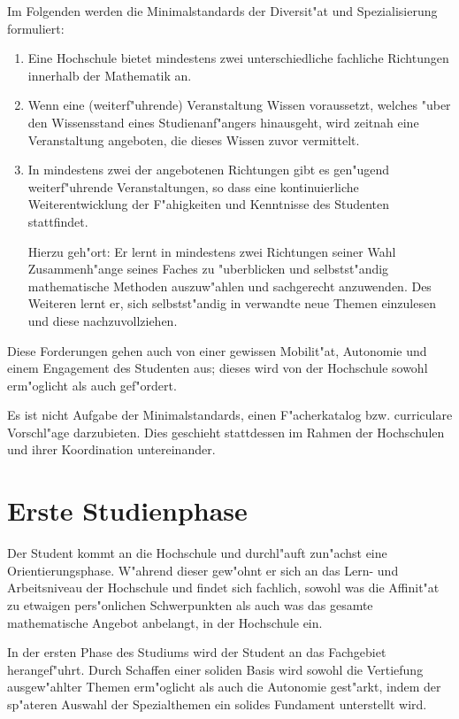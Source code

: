 \newpage
Im Folgenden werden die Minimalstandards der Diversit"at und Spezialisierung formuliert:
\begin{enumerate}
\item Eine Hochschule bietet mindestens zwei unterschiedliche fachliche Richtungen innerhalb der Mathematik an.

\item Wenn eine (weiterf"uhrende) Veranstaltung Wissen voraussetzt,
welches "uber den Wissensstand eines Studienanf"angers hinausgeht,
wird zeitnah eine Veranstaltung angeboten, die dieses Wissen zuvor vermittelt.

\item In mindestens zwei der angebotenen Richtungen gibt es gen"ugend
weiterf"uhrende Veranstaltungen, so dass eine kontinuierliche
Weiterentwicklung der F"ahigkeiten und Kenntnisse des Studenten
stattfindet.

Hierzu geh"ort: Er lernt in mindestens zwei Richtungen seiner Wahl
Zusammenh"ange seines Faches zu "uberblicken und selbstst"andig
mathematische Methoden auszuw"ahlen und sachgerecht anzuwenden.
Des Weiteren lernt er, sich selbstst"andig in verwandte neue Themen
einzulesen und diese nachzuvollziehen.
\end{enumerate}

Diese Forderungen gehen auch von einer gewissen Mobilit"at, Autonomie
und einem Engagement des Studenten aus; dieses wird von
der Hochschule sowohl erm"oglicht als auch gef"ordert.

Es ist nicht Aufgabe der Minimalstandards, einen F"acherkatalog bzw.
curriculare Vorschl"age darzubieten. Dies geschieht stattdessen im
Rahmen der Hochschulen und ihrer Koordination untereinander.




\section{Erste Studienphase}

Der
Student kommt an die Hochschule und durchl"auft zun"achst eine Orientierungsphase.
W"ahrend dieser gew"ohnt er sich an das Lern- und Arbeitsniveau der Hochschule und
findet sich fachlich, sowohl was die Affinit"at zu etwaigen pers"onlichen Schwerpunkten
als auch was das gesamte mathematische Angebot anbelangt, in der Hochschule ein.

In der ersten Phase des Studiums wird der Student an das Fachgebiet herangef"uhrt.
Durch Schaffen einer soliden Basis wird sowohl die Vertiefung ausgew"ahlter Themen
erm"oglicht als auch die Autonomie gest"arkt, indem der sp"ateren Auswahl der
Spezialthemen ein solides Fundament unterstellt wird.

